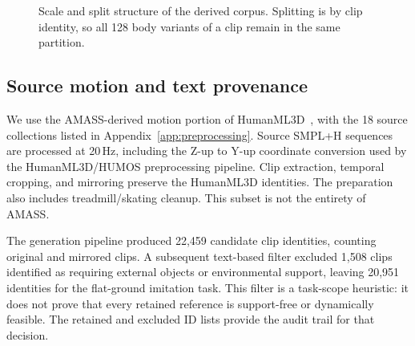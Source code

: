 \documentclass[11pt]{article}
\begin{document}
\begin{figure}[t]
\centering
{}
\caption{Scale and split structure of the derived corpus. Splitting is by clip
identity, so all 128 body variants of a clip remain in the same partition.}
\label{fig:dataset_scale}
\end{figure}

\subsection{Source motion and text provenance}\label{sec:source_data}

We use the AMASS-derived motion portion of HumanML3D~\cite{amass,humanml3d}, with the 18 source collections listed in
Appendix~\ref{app:preprocessing}. Source SMPL+H sequences are processed at
20\,Hz, including the Z-up to Y-up coordinate conversion used by the
HumanML3D/HUMOS preprocessing pipeline. Clip extraction, temporal cropping, and
mirroring preserve the HumanML3D identities. The preparation also includes
treadmill/skating cleanup. This subset is not the entirety of AMASS.

The generation pipeline produced 22,459 candidate clip identities, counting
original and mirrored clips. A subsequent text-based filter excluded 1,508
clips identified as requiring external objects or environmental support,
leaving 20,951 identities for the flat-ground imitation task. This filter is a
task-scope heuristic: it does not prove that every retained reference is
support-free or dynamically feasible. The retained and excluded ID lists
provide the audit trail for that decision.
\end{document}
